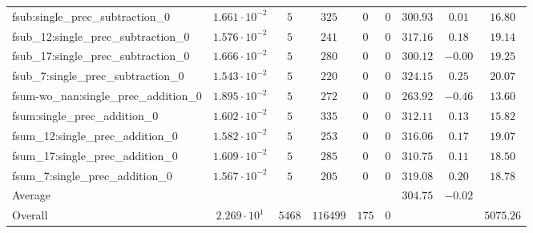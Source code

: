 \begin{tabular}{|l|c|c|c|c|c|c|c|c|}
fsub:single\_prec\_subtraction\_0              & $ 1.661 \cdot 10^{-2} $ & $ 5      $ & $ 325    $ & $ 0   $ & $ 0   $ & $ 300.93      $ & $ 0.01    $ & $ 16.80   $ \\
fsub\_12:single\_prec\_subtraction\_0          & $ 1.576 \cdot 10^{-2} $ & $ 5      $ & $ 241    $ & $ 0   $ & $ 0   $ & $ 317.16      $ & $ 0.18    $ & $ 19.14   $ \\
fsub\_17:single\_prec\_subtraction\_0          & $ 1.666 \cdot 10^{-2} $ & $ 5      $ & $ 280    $ & $ 0   $ & $ 0   $ & $ 300.12      $ & $ -0.00   $ & $ 19.25   $ \\
fsub\_7:single\_prec\_subtraction\_0           & $ 1.543 \cdot 10^{-2} $ & $ 5      $ & $ 220    $ & $ 0   $ & $ 0   $ & $ 324.15      $ & $ 0.25    $ & $ 20.07   $ \\
fsum-wo\_nan:single\_prec\_addition\_0         & $ 1.895 \cdot 10^{-2} $ & $ 5      $ & $ 272    $ & $ 0   $ & $ 0   $ & $ 263.92      $ & $ -0.46   $ & $ 13.60   $ \\
fsum:single\_prec\_addition\_0                 & $ 1.602 \cdot 10^{-2} $ & $ 5      $ & $ 335    $ & $ 0   $ & $ 0   $ & $ 312.11      $ & $ 0.13    $ & $ 15.82   $ \\
fsum\_12:single\_prec\_addition\_0             & $ 1.582 \cdot 10^{-2} $ & $ 5      $ & $ 253    $ & $ 0   $ & $ 0   $ & $ 316.06      $ & $ 0.17    $ & $ 19.07   $ \\
fsum\_17:single\_prec\_addition\_0             & $ 1.609 \cdot 10^{-2} $ & $ 5      $ & $ 285    $ & $ 0   $ & $ 0   $ & $ 310.75      $ & $ 0.11    $ & $ 18.50   $ \\
fsum\_7:single\_prec\_addition\_0              & $ 1.567 \cdot 10^{-2} $ & $ 5      $ & $ 205    $ & $ 0   $ & $ 0   $ & $ 319.08      $ & $ 0.20    $ & $ 18.78   $ \\
\hline
Average                                        & $                     $ & $        $ & $        $ & $     $ & $     $ & $ 304.75      $ & $ -0.02   $ & $         $ \\
\hline
Overall                                        & $ 2.269 \cdot 10^{1}  $ & $ 5468   $ & $ 116499 $ & $ 175 $ & $ 0   $ & $             $ & $         $ & $ 5075.26 $ \\
\hline
\end{tabular}
